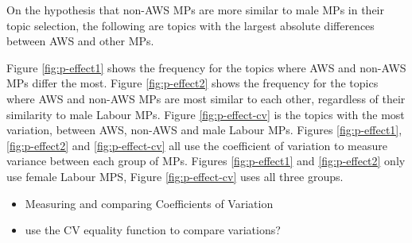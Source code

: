 \documentclass[]{article}
\theoremstyle{definition}
\theoremstyle{definition}
\theoremstyle{definition}
\theoremstyle{remark}
\begin{document}
\begin{table}[H]
\begin{table}[H]
\begin{table}[H]
\begin{table}[H]
\begin{table}[H]
\begin{table}[H]
\begin{table}[H]
\begin{table}[H]
On the hypothesis that non-AWS MPs are more similar to male MPs in their
topic selection, the following are topics with the largest absolute
differences between AWS and other MPs.

Figure \ref{fig:p-effect1} shows the frequency for the topics where AWS
and non-AWS MPs differ the most. Figure \ref{fig:p-effect2} shows the
frequency for the topics where AWS and non-AWS MPs are most similar to
each other, regardless of their similarity to male Labour MPs. Figure
\ref{fig:p-effect-cv} is the topics with the most variation, between
AWS, non-AWS and male Labour MPs. Figures \ref{fig:p-effect1},
\ref{fig:p-effect2} and \ref{fig:p-effect-cv} all use the coefficient of
variation to measure variance between each group of MPs. Figures
\ref{fig:p-effect1} and \ref{fig:p-effect2} only use female Labour MPS,
Figure \ref{fig:p-effect-cv} uses all three groups.

\begin{itemize}
\item
  Measuring and comparing Coefficients of Variation
\item
  use the CV equality function to compare variations?
\end{itemize}


\end{table}
\end{table}
\end{table}
\end{table}
\end{table}
\end{table}
\end{table}
\end{table}
\end{document}
